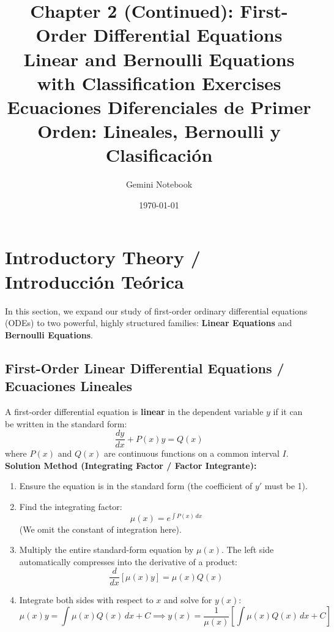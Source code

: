 \documentclass[11pt,letterpaper]{article}
\title{\textbf{Chapter 2 (Continued): First-Order Differential Equations}\\
\large Linear and Bernoulli Equations with Classification Exercises\\
\normalsize Ecuaciones Diferenciales de Primer Orden: Lineales, Bernoulli y Clasificación}
\author{Gemini Notebook}
\date{\today}
\begin{document}
\maketitle

\section{Introductory Theory / Introducción Teórica}

In this section, we expand our study of first-order ordinary differential equations (ODEs) to two powerful, highly structured families: \textbf{Linear Equations} and \textbf{Bernoulli Equations}.

\subsection{First-Order Linear Differential Equations / Ecuaciones Lineales}
A first-order differential equation is \textbf{linear} in the dependent variable $y$ if it can be written in the standard form:
\begin{equation}
    \frac{dy}{dx} + P(x)y = Q(x)
\end{equation}
where $P(x)$ and $Q(x)$ are continuous functions on a common interval $I$. 
\textbf{Solution Method (Integrating Factor / Factor Integrante):}
\begin{enumerate}
    \item Ensure the equation is in the standard form (the coefficient of $y'$ must be 1).
    \item Find the integrating factor:
    \begin{equation}
        \mu(x) = e^{\int P(x) \, dx}
    \end{equation}
    (We omit the constant of integration here).
    \item Multiply the entire standard-form equation by $\mu(x)$. The left side automatically compresses into the derivative of a product:
    \begin{equation}
        \frac{d}{dx} \left[ \mu(x) y \right] = \mu(x) Q(x)
    \end{equation}
    \item Integrate both sides with respect to $x$ and solve for $y(x)$:
    \begin{equation}
        \mu(x) y = \int \mu(x) Q(x) \, dx + C \implies y(x) = \frac{1}{\mu(x)} \left[ \int \mu(x) Q(x) \, dx + C \right]
    \end{equation}
\end{enumerate}
\end{document}
